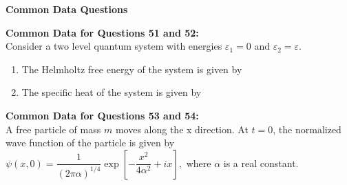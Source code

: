 \documentclass[14pt, a4paper]{extarticle}
\begin{document}
\vspace{1.5em}
\noindent
\textbf{Common Data Questions}
\vspace{1em}

\noindent
\textbf{Common Data for Questions 51 and 52:} \\
Consider a two level quantum system with energies $\varepsilon_1 = 0$ and $\varepsilon_2 = \varepsilon$.

\begin{enumerate}[label=\textbf{Q. \arabic*}, start=51]

\item The Helmholtz free energy of the system is given by
\begin{enumerate}
\end{enumerate}

\item The specific heat of the system is given by
\begin{enumerate}
\end{enumerate}

\end{enumerate}

\vspace{1.5em}
\noindent
\textbf{Common Data for Questions 53 and 54:} \\
A free particle of mass $m$ moves along the x direction.
At $t=0$, the normalized wave function of the particle is given by
$ \psi(x,0) = \dfrac{1}{(2\pi\alpha)^{1/4}}\exp\left[-\dfrac{x^2}{4\alpha^2} + ix\right], $
where $\alpha$ is a real constant.
\end{document}
